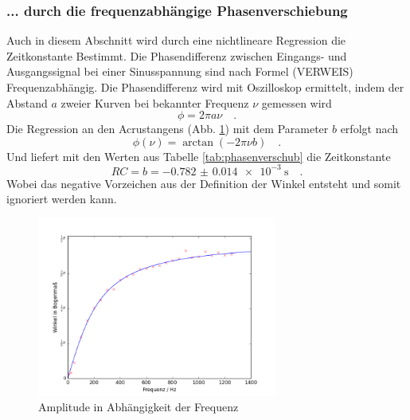 \clearpage
\subsubsection{... durch die frequenzabhängige Phasenverschiebung}
Auch in diesem Abschnitt wird durch eine nichtlineare Regression die Zeitkonstante Bestimmt. Die Phasendifferenz zwischen Eingangs- und Ausgangssignal bei einer Sinusspannung sind nach Formel (VERWEIS) Frequenzabhängig. Die Phasendifferenz wird mit Oszilloskop ermittelt, indem der Abstand $a$ zweier Kurven bei bekannter Frequenz $\nu$ gemessen wird
\begin{equation}
\phi = 2 \pi a \nu \quad .
\end{equation}
Die Regression an den Acrustangens (Abb. \ref{fig:phasenverschub}) mit dem Parameter $b$ erfolgt nach
\begin{equation}
\phi (\nu) = \arctan(-2\pi \nu b) \quad .
\end{equation}
Und liefert mit den Werten aus Tabelle \ref{tab:phasenverschub} die Zeitkonstante
\begin{equation}
RC = b = \SI{-0.782(14)e-3}{\second} \quad.
\end{equation}
Wobei das negative Vorzeichen aus der Definition der Winkel entsteht und somit ignoriert werden kann.

\begin{figure}[h!]
	\centering
	\includegraphics[width=0.7\textwidth]{Phasenverschub1.png}
	\caption{Amplitude in Abhängigkeit der Frequenz}
	\label{fig:phasenverschub}
\end{figure} 


